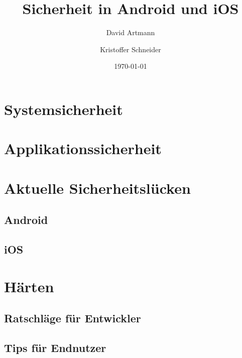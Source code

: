 \documentclass[aspectratio=169]{beamer}
\title{Sicherheit in Android und iOS}
\author{David Artmann \and Kristoffer Schneider}
\institute[Universities of]
{
\inst{}
Hochschule für angewandte Wissenschaften\\
Würzburg-Schweinfurt
}
\date{\today}
\begin{document}



\section[Systemsicherheit]{Systemsicherheit}
	
\section[Applikationssicherheit]{Applikationssicherheit}
	
	
\section[Aktuelle Sicherheitslücken]{Aktuelle Sicherheitslücken}
	\subsection{Android}
		
	\subsection{iOS}
		
		
		
\section{Härten}
	\subsection{Ratschläge für Entwickler}
		
		
	\subsection{Tips für Endnutzer}
		
\end{document}
